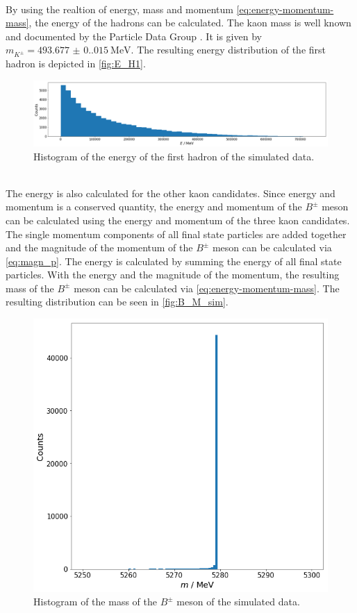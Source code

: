 \\ By using the realtion of energy, mass and momentum \autoref{eq:energy-momentum-mass}, the energy of the hadrons can be calculated. The kaon mass is well known and documented by the Particle Data Group \cite{PDG}.
It is given by $m_{K^{\pm}} = \qty{493.677(0.015)}{\mega\electronvolt}$. The resulting energy distribution of the first hadron is depicted in  \autoref{fig:E_H1}.
\begin{figure}
  \centering
  \includegraphics[width = .95\textwidth]{"content/pics/E_H1.png"}
  \caption{Histogram of the energy of the first hadron of the simulated data.}
  \label{fig:E_H1}
\end{figure}
\\The energy is also calculated for the other kaon candidates. Since energy and momentum is a conserved quantity, the energy and momentum of the $B^{\pm}$ meson can be calculated
using the energy and momentum of the three kaon candidates. The single momentum components of all final state particles are added together and the magnitude of the momentum of the $B^{\pm}$
meson can be calculated via \autoref{eq:magn_p}. The energy is calculated by summing the energy of all final state particles. With the energy and the magnitude of the momentum, the resulting
mass of the $B^{\pm}$ meson can be calculated via \autoref{eq:energy-momentum-mass}. The resulting distribution can be seen in \autoref{fig:B_M_sim}.
\begin{figure}
  \centering
  \includegraphics[width = .95\textwidth]{"content/pics/B_M_sim.png"}
  \caption{Histogram of the mass of the $B^{\pm}$ meson of the simulated data.}
  \label{fig:B_M_sim}
\end{figure}
